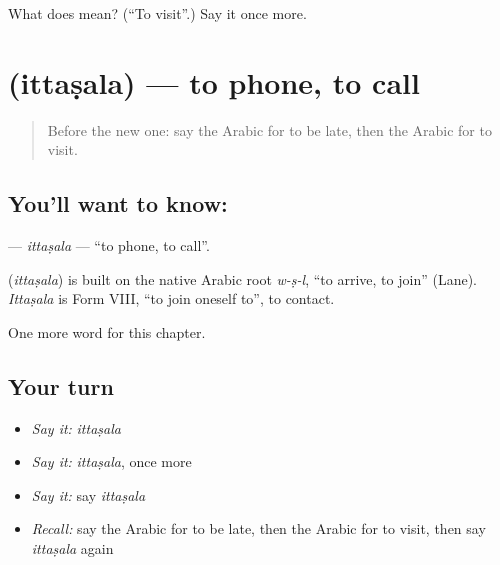 \begin{tcolorbox}[breakable,colback=teal!4,colframe=teal!35!black,title={Before you move on}]
What does  mean? (\textquotedblleft{}To visit\textquotedblright{}.) Say it once more.
\end{tcolorbox}
\section[\texorpdfstring{\ar{اتصل} (ittaṣala)}{اتصل (ittaṣala)}]{ (ittaṣala) — to phone, to call}

\label{lesson:AR-C255-ittasala}



\begin{quote}
Before the new one: say the Arabic for to be late, then the Arabic for to visit.
\end{quote}

\subsection*{You'll want to know: }
\textbf{} — \emph{ittaṣala} — \textquotedblleft{}to phone, to call\textquotedblright{}.

\begin{cousinweb}
\textbf{} (\emph{ittaṣala}) is built on the native Arabic root \emph{w-ṣ-l}, \textquotedblleft{}to arrive, to join\textquotedblright{} (Lane). \emph{Ittaṣala} is Form VIII, \textquotedblleft{}to join oneself to\textquotedblright{}, to contact.
\end{cousinweb}

\begin{grammarlens}[title={What you've built}]
One more word for this chapter.
\end{grammarlens}

\subsection*{Your turn}
\begin{itemize}
\raggedright
  \item \emph{Say it:} \emph{ittaṣala}
  \item \emph{Say it:} \emph{ittaṣala}, once more
  \item \emph{Say it:} say \emph{ittaṣala}
  \item \emph{Recall:} say the Arabic for to be late, then the Arabic for to visit, then say \emph{ittaṣala} again
\end{itemize}

